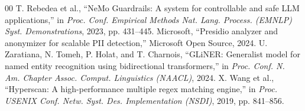 \documentclass[conference]{IEEEtran}
\begin{document}
\begin{thebibliography}{00}
 T. Rebedea et al., ``NeMo Guardrails: A system for controllable and safe LLM applications,'' in \emph{Proc. Conf. Empirical Methods Nat. Lang. Process. (EMNLP) Syst. Demonstrations}, 2023, pp. 431--445.
 Microsoft, ``Presidio analyzer and anonymizer for scalable PII detection,'' Microsoft Open Source, 2024.
 U. Zaratiana, N. Tomeh, P. Holat, and T. Charnois, ``GLiNER: Generalist model for named entity recognition using bidirectional transformers,'' in \emph{Proc. Conf. N. Am. Chapter Assoc. Comput. Linguistics (NAACL)}, 2024.
 X. Wang et al., ``Hyperscan: A high-performance multiple regex matching engine,'' in \emph{Proc. USENIX Conf. Netw. Syst. Des. Implementation (NSDI)}, 2019, pp. 841--856.
\end{thebibliography}
\end{document}
